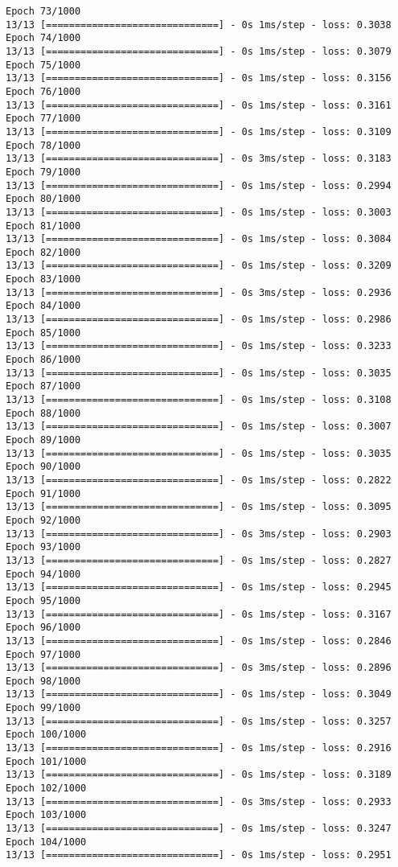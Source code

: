 \documentclass[11pt]{article}
\begin{document}
\begin{Verbatim}[commandchars=\\\{\}]
Epoch 73/1000
13/13 [==============================] - 0s 1ms/step - loss: 0.3038
Epoch 74/1000
13/13 [==============================] - 0s 1ms/step - loss: 0.3079
Epoch 75/1000
13/13 [==============================] - 0s 1ms/step - loss: 0.3156
Epoch 76/1000
13/13 [==============================] - 0s 1ms/step - loss: 0.3161
Epoch 77/1000
13/13 [==============================] - 0s 1ms/step - loss: 0.3109
Epoch 78/1000
13/13 [==============================] - 0s 3ms/step - loss: 0.3183
Epoch 79/1000
13/13 [==============================] - 0s 1ms/step - loss: 0.2994
Epoch 80/1000
13/13 [==============================] - 0s 1ms/step - loss: 0.3003
Epoch 81/1000
13/13 [==============================] - 0s 1ms/step - loss: 0.3084
Epoch 82/1000
13/13 [==============================] - 0s 1ms/step - loss: 0.3209
Epoch 83/1000
13/13 [==============================] - 0s 3ms/step - loss: 0.2936
Epoch 84/1000
13/13 [==============================] - 0s 1ms/step - loss: 0.2986
Epoch 85/1000
13/13 [==============================] - 0s 1ms/step - loss: 0.3233
Epoch 86/1000
13/13 [==============================] - 0s 1ms/step - loss: 0.3035
Epoch 87/1000
13/13 [==============================] - 0s 1ms/step - loss: 0.3108
Epoch 88/1000
13/13 [==============================] - 0s 1ms/step - loss: 0.3007
Epoch 89/1000
13/13 [==============================] - 0s 1ms/step - loss: 0.3035
Epoch 90/1000
13/13 [==============================] - 0s 1ms/step - loss: 0.2822
Epoch 91/1000
13/13 [==============================] - 0s 1ms/step - loss: 0.3095
Epoch 92/1000
13/13 [==============================] - 0s 3ms/step - loss: 0.2903
Epoch 93/1000
13/13 [==============================] - 0s 1ms/step - loss: 0.2827
Epoch 94/1000
13/13 [==============================] - 0s 1ms/step - loss: 0.2945
Epoch 95/1000
13/13 [==============================] - 0s 1ms/step - loss: 0.3167
Epoch 96/1000
13/13 [==============================] - 0s 1ms/step - loss: 0.2846
Epoch 97/1000
13/13 [==============================] - 0s 3ms/step - loss: 0.2896
Epoch 98/1000
13/13 [==============================] - 0s 1ms/step - loss: 0.3049
Epoch 99/1000
13/13 [==============================] - 0s 1ms/step - loss: 0.3257
Epoch 100/1000
13/13 [==============================] - 0s 1ms/step - loss: 0.2916
Epoch 101/1000
13/13 [==============================] - 0s 1ms/step - loss: 0.3189
Epoch 102/1000
13/13 [==============================] - 0s 3ms/step - loss: 0.2933
Epoch 103/1000
13/13 [==============================] - 0s 1ms/step - loss: 0.3247
Epoch 104/1000
13/13 [==============================] - 0s 1ms/step - loss: 0.2951

\end{Verbatim}
\end{document}
